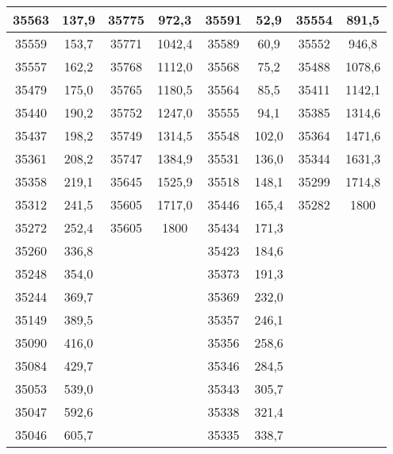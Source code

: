 \documentclass[11pt]{article}
\begin{document}
{{\begin{tabular}{|c|c|c|c|c|c|c|c|}
            \hline 
            35563 & 137,9 & 35775 & 972,3 & 35591 & 52,9 & 35554 & 891,5\tabularnewline
            \hline 
            35559 & 153,7 & 35771 & 1042,4 & 35589 & 60,9 & 35552 & 946,8\tabularnewline
            \hline 
            35557 & 162,2 & 35768 & 1112,0 & 35568 & 75,2 & 35488 & 1078,6\tabularnewline
            \hline 
            35479 & 175,0 & 35765 & 1180,5 & 35564 & 85,5 & 35411 & 1142,1\tabularnewline
            \hline 
            35440 & 190,2 & 35752 & 1247,0 & 35555 & 94,1 & 35385 & 1314,6\tabularnewline
            \hline 
            35437 & 198,2 & 35749 & 1314,5 & 35548 & 102,0 & 35364 & 1471,6\tabularnewline
            \hline 
            35361 & 208,2 & 35747 & 1384,9 & 35531 & 136,0 & 35344 & 1631,3\tabularnewline
            \hline 
            35358 & 219,1 & 35645 & 1525,9 & 35518 & 148,1 & 35299 & 1714,8\tabularnewline
            \hline 
            35312 & 241,5 & 35605 & 1717,0 & 35446 & 165,4 & 35282 & 1800\tabularnewline
            \hline 
            35272 & 252,4 & 35605 & 1800 & 35434 & 171,3 & \multicolumn{1}{c}{} & \multicolumn{1}{c}{}\tabularnewline
            \cline{1-6} 
            35260 & 336,8 & \multicolumn{1}{c}{} &  & 35423 & 184,6 & \multicolumn{1}{c}{} & \multicolumn{1}{c}{}\tabularnewline
            \cline{1-2} \cline{5-6} 
            35248 & 354,0 & \multicolumn{1}{c}{} &  & 35373 & 191,3 & \multicolumn{1}{c}{} & \multicolumn{1}{c}{}\tabularnewline
            \cline{1-2} \cline{5-6} 
            35244 & 369,7 & \multicolumn{1}{c}{} &  & 35369 & 232,0 & \multicolumn{1}{c}{} & \multicolumn{1}{c}{}\tabularnewline
            \cline{1-2} \cline{5-6} 
            35149 & 389,5 & \multicolumn{1}{c}{} &  & 35357 & 246,1 & \multicolumn{1}{c}{} & \multicolumn{1}{c}{}\tabularnewline
            \cline{1-2} \cline{5-6} 
            35090 & 416,0 & \multicolumn{1}{c}{} &  & 35356 & 258,6 & \multicolumn{1}{c}{} & \multicolumn{1}{c}{}\tabularnewline
            \cline{1-2} \cline{5-6} 
            35084 & 429,7 & \multicolumn{1}{c}{} &  & 35346 & 284,5 & \multicolumn{1}{c}{} & \multicolumn{1}{c}{}\tabularnewline
            \cline{1-2} \cline{5-6} 
            35053 & 539,0 & \multicolumn{1}{c}{} &  & 35343 & 305,7 & \multicolumn{1}{c}{} & \multicolumn{1}{c}{}\tabularnewline
            \cline{1-2} \cline{5-6} 
            35047 & 592,6 & \multicolumn{1}{c}{} &  & 35338 & 321,4 & \multicolumn{1}{c}{} & \multicolumn{1}{c}{}\tabularnewline
            \cline{1-2} \cline{5-6} 
            35046 & 605,7 & \multicolumn{1}{c}{} &  & 35335 & 338,7 & \multicolumn{1}{c}{} & \multicolumn{1}{c}{}\tabularnewline

\end{tabular}}}
\end{document}
